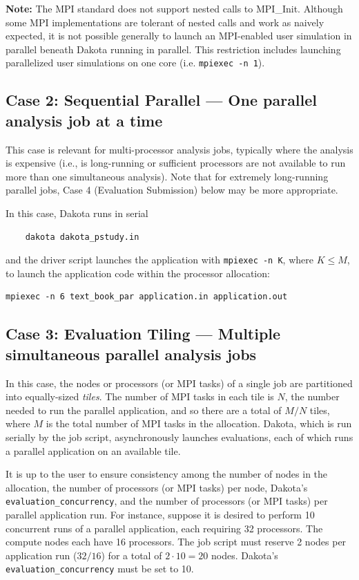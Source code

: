 {\bf Note:} The MPI standard does not support nested calls to MPI\_Init.
Although some MPI implementations are tolerant of nested calls and work as 
naively expected, it is not possible generally to launch an MPI-enabled user 
simulation in parallel beneath Dakota running in parallel. This restriction 
includes launching parallelized user simulations on one core (i.e. {\tt  mpiexec -n 1}).

\subsection{Case 2: Sequential Parallel --- One parallel analysis job at a time}

This case is relevant for multi-processor analysis jobs, typically
where the analysis is expensive (i.e., is long-running or sufficient
processors are not available to run more than one simultaneous
analysis).  Note that for extremely long-running parallel jobs, Case 4 (Evaluation
Submission) below may be more appropriate.

In this case, Dakota runs in serial
\begin{verbatim}
    dakota dakota_pstudy.in
\end{verbatim}
and the driver script launches the application with {\tt mpiexec -n
K}, where $K \leq M$, to launch the application code within the
processor allocation:
\begin{verbatim}
mpiexec -n 6 text_book_par application.in application.out
\end{verbatim}
\subsection{Case 3: Evaluation Tiling --- Multiple simultaneous parallel analysis jobs}

In this case, the nodes or processors (or MPI tasks) of a single job are 
partitioned into equally-sized \textit{tiles}. The number of MPI tasks in each 
tile is $N$, the number needed to run the parallel application, and so there 
are a total of $M/N$ tiles, where $M$ is the total number of MPI tasks in the 
allocation. Dakota, which is run serially by the job script, asynchronously 
launches evaluations, each of which runs a parallel application on an available 
tile.

It is up to the user to ensure consistency among the number of nodes 
in the allocation, the number of processors (or MPI tasks) per node, 
Dakota's {\tt evaluation\_concurrency}, and the number of processors 
(or MPI tasks) per parallel application run. For instance, suppose it 
is desired to perform 10 concurrent runs of a parallel application,
each requiring 32 processors. The compute nodes each have 16 processors.
The job script must reserve 2 nodes per application run ($32/16$) for a
total of $2 \cdot 10 = 20$ nodes. Dakota's {\tt evaluation\_concurrency} must be
set to 10.

